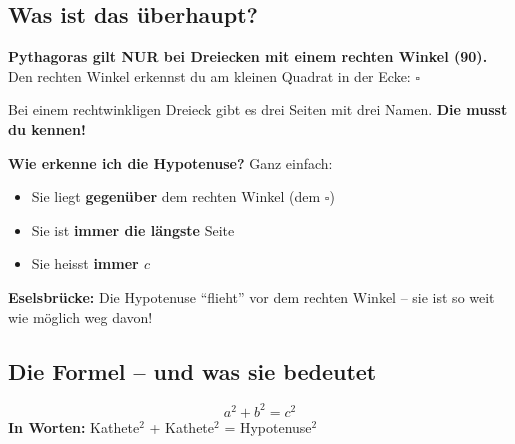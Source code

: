 \documentclass[12pt, a4paper]{article}
\begin{document}
\subsection{Was ist das \"uberhaupt?}

\begin{merkbox}
\textbf{Pythagoras gilt NUR bei Dreiecken mit einem rechten Winkel (90\textdegree).}\\
Den rechten Winkel erkennst du am kleinen Quadrat in der Ecke: $\square$
\end{merkbox}

Bei einem rechtwinkligen Dreieck gibt es drei Seiten mit drei Namen.
\textbf{Die musst du kennen!}

\begin{center}
\end{center}

\begin{tipbox}
\textbf{Wie erkenne ich die Hypotenuse?} Ganz einfach:\\[0.3cm]
\begin{itemize}
  \item Sie liegt \textbf{gegen\"uber} dem rechten Winkel (dem $\square$)
  \item Sie ist \textbf{immer die l\"angste} Seite
  \item Sie heisst \textbf{immer $c$}
\end{itemize}
\textbf{Eselsbr\"ucke:} Die Hypotenuse ``flieht'' vor dem rechten Winkel -- sie ist so weit wie m\"oglich weg davon!
\end{tipbox}

\newpage

\subsection{Die Formel -- und was sie bedeutet}

\begin{formulabox}
\[
  \boxed{a^2 + b^2 = c^2}
\]
\textbf{In Worten:} Kathete$^2$ + Kathete$^2$ = Hypotenuse$^2$
\end{formulabox}
\end{document}
